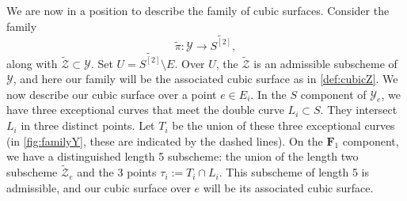 \documentclass[reqno]{amsart}
\renewcommand{\to}{{\longrightarrow}}
\numberwithin{equation}{section}
\newcommand{\F}{\mathbf{F}}
\begin{document}
We are now in a position to describe the family of cubic surfaces.
Consider the family
\[ \widetilde{\pi} \colon \mathcal{Y} \to \widetilde{S^{[2]}},\]
along with $\widetilde {\mathcal{Z}} \subset \mathcal{Y}$.
Set $U = \widetilde{S^{[2]}} \setminus E$.
Over $U$, the $\widetilde{\mathcal{Z}}$ is an admissible subscheme of $\mathcal{Y}$, and here our family will be the associated cubic surface as in \autoref{def:cubicZ}.
We now describe our cubic surface over a point $e \in E_i$.
In the $S$ component of $\mathcal{Y}_e$, we have three exceptional curves that meet the double curve $L_i \subset S$.
They intersect $L_i$ in three distinct points.
Let $T_i$ be the union of these three exceptional curves (in \autoref{fig:familyY}, these are indicated by the dashed lines).
On the $\F_1$ component, we have a distinguished length 5 subscheme: the union of the length two subscheme $\widetilde{\mathcal{Z}}_e$ and the 3 points $\tau_i := T_i \cap L_i$.
This subscheme of length 5 is admissible, and our cubic surface over $e$ will be its associated cubic surface.
\end{document}
